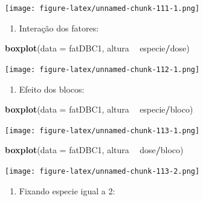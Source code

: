 \documentclass[
]{article}
\newenvironment{Shaded}{\begin{snugshade}}{\end{snugshade}}
\newcommand{\DataTypeTok}[1]{\textcolor[rgb]{0.13,0.29,0.53}{#1}}
\newcommand{\DecValTok}[1]{\textcolor[rgb]{0.00,0.00,0.81}{#1}}
\newcommand{\KeywordTok}[1]{\textcolor[rgb]{0.13,0.29,0.53}{\textbf{#1}}}
\newcommand{\NormalTok}[1]{#1}
\newcommand{\OperatorTok}[1]{\textcolor[rgb]{0.81,0.36,0.00}{\textbf{#1}}}
\newcommand{\StringTok}[1]{\textcolor[rgb]{0.31,0.60,0.02}{#1}}
\providecommand{\tightlist}{%
  \setlength{\itemsep}{0pt}\setlength{\parskip}{0pt}}
\begin{document}
\texttt{[image: figure-latex/unnamed-chunk-111-1.png]}

\begin{enumerate}
\def\labelenumi{\arabic{enumi}.}
\setcounter{enumi}{2}
\tightlist
\item
  Interação dos fatores:
\end{enumerate}

\begin{Shaded}
\begin{Highlighting}[]
\KeywordTok{boxplot}\NormalTok{(}\DataTypeTok{data =}\NormalTok{ fatDBC1, altura }\OperatorTok{~}\StringTok{ }\NormalTok{especie}\OperatorTok{/}\NormalTok{dose)}
\end{Highlighting}
\end{Shaded}

\texttt{[image: figure-latex/unnamed-chunk-112-1.png]}

\begin{enumerate}
\def\labelenumi{\arabic{enumi}.}
\setcounter{enumi}{3}
\tightlist
\item
  Efeito dos blocos:
\end{enumerate}

\begin{Shaded}
\begin{Highlighting}[]
\KeywordTok{boxplot}\NormalTok{(}\DataTypeTok{data =}\NormalTok{ fatDBC1, altura }\OperatorTok{~}\StringTok{ }\NormalTok{especie}\OperatorTok{/}\NormalTok{bloco)}
\end{Highlighting}
\end{Shaded}

\texttt{[image: figure-latex/unnamed-chunk-113-1.png]}

\begin{Shaded}
\begin{Highlighting}[]
\KeywordTok{boxplot}\NormalTok{(}\DataTypeTok{data =}\NormalTok{ fatDBC1, altura }\OperatorTok{~}\StringTok{ }\NormalTok{dose}\OperatorTok{/}\NormalTok{bloco)}
\end{Highlighting}
\end{Shaded}

\texttt{[image: figure-latex/unnamed-chunk-113-2.png]}

\begin{enumerate}
\def\labelenumi{\arabic{enumi}.}
\setcounter{enumi}{4}
\tightlist
\item
  Fixando especie igual a 2:
\end{enumerate}

\begin{Shaded}
\end{Shaded}
\end{document}
